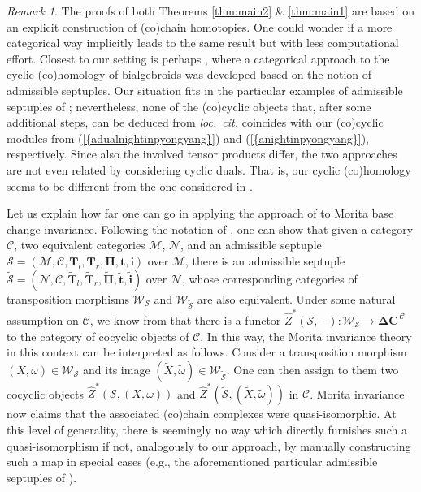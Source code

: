 \documentclass[reqno, a4paper, 10pt]{amsart}
\numberwithin{equation}{section}
\theoremstyle{plain}
\theoremstyle{definition}
\theoremstyle{remark}
\newtheorem{rem}{Remark}
\begin{document}
\begin{rem}
\label{cat}
The proofs of both Theorems \ref{thm:main2} \& \ref{thm:main1} are based on an explicit construction of (co)chain homotopies. One could wonder if a more categorical way implicitly leads to the same result but with less computational effort. 
Closest to our setting is perhaps \cite{BoeSte:CCOBAAVC}, where a categorical approach to the cyclic (co)homology of bialgebroids was developed based on the notion of admissible septuples.  
Our situation fits in the particular examples of admissible septuples of \cite[Propositions 1.15 \& 1.25]{BoeSte:CCOBAAVC}; nevertheless, none of the (co)cyclic objects that, after some additional steps, can be deduced from 
{\em loc.~cit.}
coincides with our (co)cyclic modules from {{\rm (}\ref{{adualnightinpyongyang}}{\rm )}} and {{\rm (}\ref{{anightinpyongyang}}{\rm )}}, respectively. Since also the involved tensor products differ, the two approaches are not even related by considering cyclic duals.
That is, our cyclic (co)homology seems to be different from the one considered in \cite{BoeSte:CCOBAAVC}.

Let us explain how far one can go in applying the approach of \cite{BoeSte:CCOBAAVC} to Morita base change invariance.
Following the notation of \cite{BoeSte:CCOBAAVC}, one can show that given a category ${{\mathcal C}}$, two equivalent categories ${{\mathcal M}}$, ${{\mathcal N}}$, and an admissible septuple $\mathcal{S}=({{\mathcal M}}, {{\mathcal C}}, {\boldsymbol{T}}_l, {\boldsymbol{T}}_r, \boldsymbol{\Pi}, {\boldsymbol{t}}, {\boldsymbol{i}})$ over ${{\mathcal M}}$, there is an admissible septuple ${\tilde{{\mathcal{S}}}}=({{\mathcal N}}, {{\mathcal C}},{\tilde{\boldsymbol{T}}}_l,{\tilde{\boldsymbol{T}}}_r, {\tilde{{\boldsymbol{\Pi}}}}, {\tilde{\boldsymbol{t}}}, {\tilde{{\boldsymbol{i}}}})$ over ${{\mathcal N}}$, whose corresponding categories of transposition morphisms ${{\mathcal W}}_{{\mathcal S}}$ and ${{\mathcal W}}_{{\tilde{{{\mathcal S}}}}}$ are also equivalent. 
Under some natural assumption on ${{\mathcal C}}$, we know from \cite[Corollary 1.11]{BoeSte:CCOBAAVC} that there is a functor 
$\hat{Z}^*({{\mathcal S}}, -): {{\mathcal W}}_{{\mathcal S}} \to  \boldsymbol{\Delta C}^{\,{{\mathcal C}}}$ to the category of cocyclic objects of ${{\mathcal C}}$. 
In this way, the Morita invariance theory in this context can be interpreted as follows. 
Consider a transposition morphism 
$(X, \omega) \in {{\mathcal W}}_{{\mathcal S}}$ and its image  $({\tilde{{X}}},{\tilde{{\omega}}}) \in {{\mathcal W}}_{{\tilde{{{\mathcal S}}}}}$. One can then 
assign to them two cocyclic objects $\hat{Z}^*({{\mathcal S}},
  (X,\omega))$ and $\hat{Z}^*({\tilde{{{\mathcal S}}}}, ({\tilde{{X}}},{\tilde{{\omega}}}))$ in ${{\mathcal C}}$. 
Morita invariance now claims that the associated (co)chain complexes were quasi-isomorphic.
At this level of generality, there is seemingly no way which directly furnishes such a quasi-isomorphism if not, analogously to our approach, by manually constructing such a map in special cases (e.g., the aforementioned particular admissible septuples of \cite[Propositions 1.15 \& 1.25]{BoeSte:CCOBAAVC}). 
\end{rem}
\end{document}
